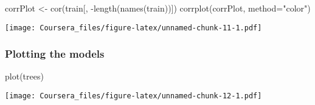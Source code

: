 \documentclass[
]{article}
\newenvironment{Shaded}{\begin{snugshade}}{\end{snugshade}}
\newcommand{\AttributeTok}[1]{\textcolor[rgb]{0.77,0.63,0.00}{#1}}
\newcommand{\FunctionTok}[1]{\textcolor[rgb]{0.00,0.00,0.00}{#1}}
\newcommand{\NormalTok}[1]{#1}
\newcommand{\OtherTok}[1]{\textcolor[rgb]{0.56,0.35,0.01}{#1}}
\newcommand{\SpecialCharTok}[1]{\textcolor[rgb]{0.00,0.00,0.00}{#1}}
\newcommand{\StringTok}[1]{\textcolor[rgb]{0.31,0.60,0.02}{#1}}
\begin{document}
\begin{Shaded}
\begin{Highlighting}[]
\NormalTok{corrPlot }\OtherTok{\textless{}{-}} \FunctionTok{cor}\NormalTok{(train[, }\SpecialCharTok{{-}}\FunctionTok{length}\NormalTok{(}\FunctionTok{names}\NormalTok{(train))])}
\FunctionTok{corrplot}\NormalTok{(corrPlot, }\AttributeTok{method=}\StringTok{"color"}\NormalTok{)}
\end{Highlighting}
\end{Shaded}

\texttt{[image: Coursera\_files/figure-latex/unnamed-chunk-11-1.pdf]}

\hypertarget{plotting-the-models}{%
\subsubsection{Plotting the models}\label{plotting-the-models}}

\begin{Shaded}
\begin{Highlighting}[]
\FunctionTok{plot}\NormalTok{(trees)}
\end{Highlighting}
\end{Shaded}

\texttt{[image: Coursera\_files/figure-latex/unnamed-chunk-12-1.pdf]}
\end{document}
